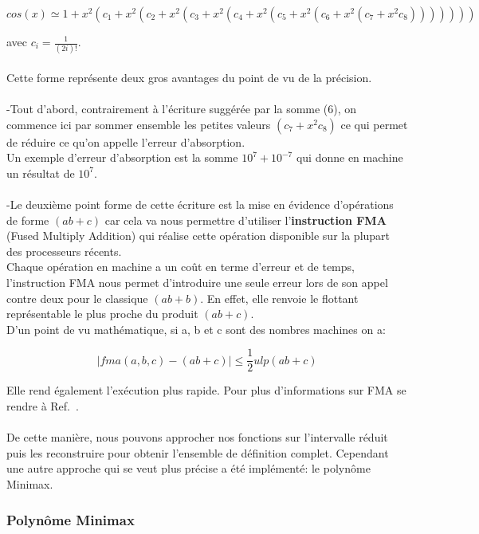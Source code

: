 \documentclass[12pt]{article}
\begin{document}
\begin{center}
\begin{equation}
  cos(x) \simeq 1 + x^2(c_1 + x^2(c_2 + x^2(c_3 + x^2(c_4 + x^2(c_5 + x^2(c_6 + x^2(c_7 +x^2c_8)))))))
\end{equation}
\end{center}
avec $c_i = \frac{1}{(2i)!}$.\\
\\
Cette forme représente deux gros avantages du point de vu de la précision. \\
\\
-Tout d'abord, contrairement à l'écriture suggérée par la somme (6), on commence ici par sommer ensemble
les petites valeurs $(c_7 +x^2c_8)$ ce qui permet de réduire ce qu'on appelle l'erreur
d'absorption. \\
Un exemple d'erreur d'absorption est la somme $10^7 + 10^{-7}$ qui donne en machine
un résultat de $10^7$. \\
\\
-Le deuxième point forme de cette écriture est la mise en évidence d'opérations de forme
$(ab + c)$ car cela va nous permettre d'utiliser l'\textbf{instruction FMA} (Fused Multiply Addition)
qui réalise cette opération disponible sur la plupart des processeurs récents.\\
Chaque opération en machine a un coût en terme d'erreur et de temps, l'instruction FMA
nous permet d'introduire une seule erreur lors de son appel contre deux pour le classique
$(ab + b)$. En effet, elle renvoie le flottant représentable le plus proche du produit $(ab + c)$.\\
D'un point de vu mathématique, si a, b et c sont des nombres machines on a:

\begin{center}
\begin{equation}
  |fma(a,b,c) - (ab+c)| \leq \frac{1}{2}ulp(ab+c)
\end{equation}
\end{center}

Elle rend également l'exécution plus rapide. Pour plus d'informations sur FMA
se rendre à Ref.~\cite{paper2}.\\
\\
De cette manière, nous pouvons approcher nos fonctions sur l'intervalle réduit puis les reconstruire
pour obtenir l'ensemble de définition complet. Cependant une autre approche qui se veut
plus précise a été implémenté: le polynôme Minimax.

\subsubsection{Polynôme Minimax}
\label{sec:minimax}
\end{document}
